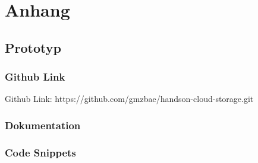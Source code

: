 
\chapter{Anhang}

\section{Prototyp}
\subsection{Github Link}

Github Link: https://github.com/gmzbae/handson-cloud-storage.git

\subsection{Dokumentation}
\subsection{Code Snippets}

\clearpage